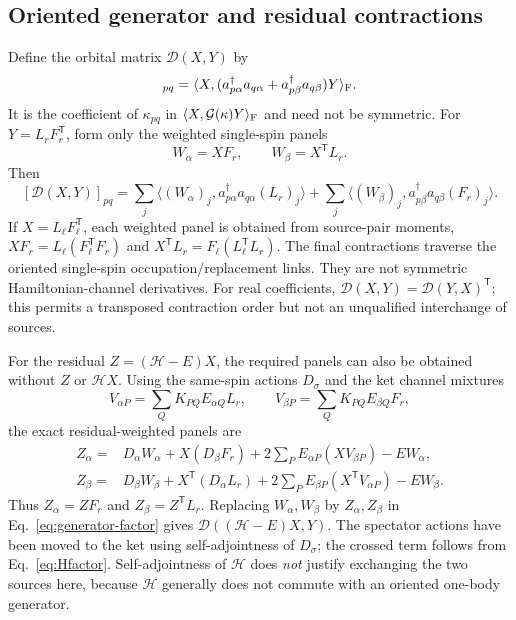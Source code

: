 \documentclass[11pt,a4paper]{article}
\newcommand{\Tr}{^{\mathsf T}}
\newcommand{\Ha}{\mathcal H}
\begin{document}
\subsection{Oriented generator and residual contractions}\label{sec:factor-generator}

Define the orbital matrix $\mathcal D(X,Y)$ by
\begin{equation}
 [\mathcal D(X,Y)]_{pq}=
 \langle X,(a^\dagger_{p\alpha}a_{q\alpha}
                 +a^\dagger_{p\beta}a_{q\beta})Y\rangle_{\rm F}.
\end{equation}
It is the coefficient of $\kappa_{pq}$ in
$\langle X,\mathcal G(\kappa)Y\rangle_{\rm F}$ and need not be symmetric.
For $Y=L_rF_r\Tr$, form only the weighted single-spin panels
\begin{equation}
 W_\alpha=XF_r,\qquad W_\beta=X\Tr L_r.
\end{equation}
Then
\begin{equation}\label{eq:generator-factor}
 [\mathcal D(X,Y)]_{pq}=
 \sum_j\langle (W_\alpha)_j,
      a^\dagger_{p\alpha}a_{q\alpha}(L_r)_j\rangle
 +\sum_j\langle (W_\beta)_j,
      a^\dagger_{p\beta}a_{q\beta}(F_r)_j\rangle.
\end{equation}
If $X=L_\ell F_\ell\Tr$, each weighted panel is obtained from source-pair
moments, $XF_r=L_\ell(F_\ell\Tr F_r)$ and
$X\Tr L_r=F_\ell(L_\ell\Tr L_r)$. The final contractions traverse the
oriented single-spin occupation/replacement links. They are not symmetric
Hamiltonian-channel derivatives. For real coefficients,
$\mathcal D(X,Y)=\mathcal D(Y,X)\Tr$; this permits a transposed
contraction order but not an unqualified interchange of sources.

For the residual $Z=(\Ha-E)X$, the required panels can also be obtained
without $Z$ or $\Ha X$. Using the same-spin actions $D_\sigma$ and
the ket channel mixtures
\begin{equation}
 V_{\alpha P}=\sum_QK_{PQ}E_{\alpha Q}L_r,\qquad
 V_{\beta P}=\sum_QK_{PQ}E_{\beta Q}F_r,
\end{equation}
the exact residual-weighted panels are
\begin{align}\label{eq:residual-panels}
 Z_\alpha={}&D_\alpha W_\alpha+X(D_\beta F_r)
       +2\sum_P E_{\alpha P}(X V_{\beta P})-E W_\alpha,\\
 Z_\beta={}&D_\beta W_\beta+X\Tr(D_\alpha L_r)
       +2\sum_P E_{\beta P}(X\Tr V_{\alpha P})-E W_\beta.
\end{align}
Thus $Z_\alpha=ZF_r$ and $Z_\beta=Z\Tr L_r$. Replacing
$W_\alpha,W_\beta$ by $Z_\alpha,Z_\beta$ in
Eq.~\eqref{eq:generator-factor} gives $\mathcal D((\Ha-E)X,Y)$.
The spectator actions have been moved to the ket using self-adjointness
of $D_\sigma$; the crossed term follows from Eq.~\eqref{eq:Hfactor}.
Self-adjointness of $\Ha$ does \emph{not} justify exchanging the two
sources here, because $\Ha$ generally does not commute with an oriented
one-body generator.
\end{document}
